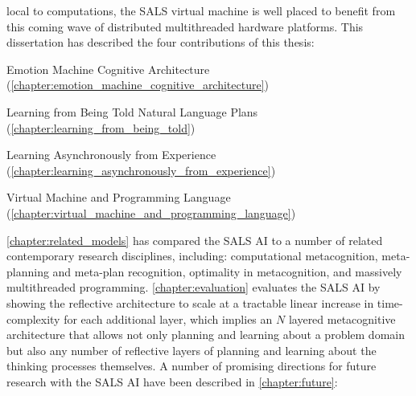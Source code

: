 local to computations, the SALS virtual machine is well placed to
benefit from this coming wave of distributed multithreaded hardware
platforms.  This dissertation has described the four contributions of
this thesis:
\begin{samepage}
\begin{packed_enumerate}
\item Emotion Machine Cognitive Architecture ({\mbox{\autoref{chapter:emotion_machine_cognitive_architecture}}})
\item Learning from Being Told Natural Language Plans ({\mbox{\autoref{chapter:learning_from_being_told}}})
\item Learning Asynchronously from Experience ({\mbox{\autoref{chapter:learning_asynchronously_from_experience}}})
\item Virtual Machine and Programming Language ({\mbox{\autoref{chapter:virtual_machine_and_programming_language}}})
\end{packed_enumerate}
\end{samepage}
{\mbox{\autoref{chapter:related_models}}} has compared the SALS AI to
a number of related contemporary research disciplines, including:
computational metacognition, meta-planning and meta-plan recognition,
optimality in metacognition, and massively multithreaded programming.
{\mbox{\autoref{chapter:evaluation}}} evaluates the SALS AI by showing
the reflective architecture to scale at a tractable linear increase in
time-complexity for each additional layer, which implies an $N$
layered metacognitive architecture that allows not only planning and
learning about a problem domain but also any number of reflective
layers of planning and learning about the thinking processes
themselves.  A number of promising directions for future research with
the SALS AI have been described in {\mbox{\autoref{chapter:future}}}:
